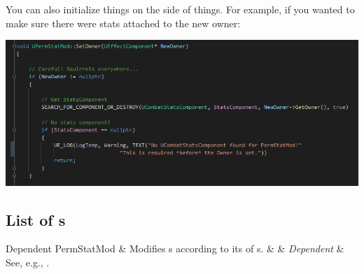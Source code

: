 \newpage

You can also initialize things on the  side of things. For example, if you wanted to make sure there were stats attached to the new owner:

\begin{center}
	\includegraphics[scale=\ScreenshotScale]{dependent-customization}
\end{center}

\subsection{List of s}

\begin{EffectTable}{Dependent}
	PermStatMod	& {Modifies s according to its  of s.}	&  & \textit{Dependent} & See, e.g., .\\
\end{EffectTable}


\postamble{}